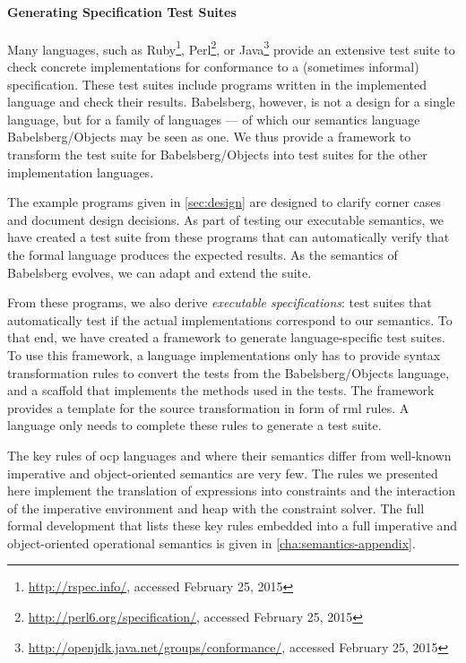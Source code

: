 \paragraph*{Generating Specification Test Suites}
Many languages, such as Ruby\footnote{\url{http://rspec.info/}, accessed February
  25, 2015}, Perl\footnote{\url{http://perl6.org/specification/}, accessed February
  25, 2015}, or Java\footnote{\url{http://openjdk.java.net/groups/conformance/},
  accessed February 25, 2015} provide an extensive test suite to check concrete
implementations for conformance to a (sometimes informal) specification. These
test suites include programs written in the implemented language and check their
results. Babelsberg, however, is not a design for a single language, but for a
family of languages --- of which our semantics language Babelsberg/Objects may
be seen as one. We thus provide a framework to transform the test suite for
Babelsberg/Objects into test suites for the other implementation languages.

The example programs given in \autoref{sec:design} are designed to clarify
corner cases and document design decisions. As part of testing our executable
semantics, we have created a test suite from these programs that can
automatically verify that the formal language produces the expected results. As
the semantics of Babelsberg evolves, we can adapt and extend the suite.

From these programs, we also derive \emph{executable specifications}: test
suites that automatically test if the actual implementations correspond to our
semantics. To that end, we have created a framework to generate
language-specific test suites. To use this framework, a language implementations
only has to provide syntax transformation rules to convert the tests from the
Babelsberg/Objects language, and a scaffold that implements the methods used in
the tests. The framework provides a template for the source transformation in
form of \gls{rml} rules. A language only needs to complete these rules to
generate a test suite.

\SummarySep
The key rules of \ac{ocp} languages and where their semantics differ from
well-known imperative and object-oriented semantics are very few. The rules we
presented here implement the translation of expressions into constraints and the
interaction of the imperative environment and heap with the constraint
solver. The full formal development that lists these key rules embedded into a
full imperative and object-oriented operational semantics is given in
\autoref{cha:semantics-appendix}.

